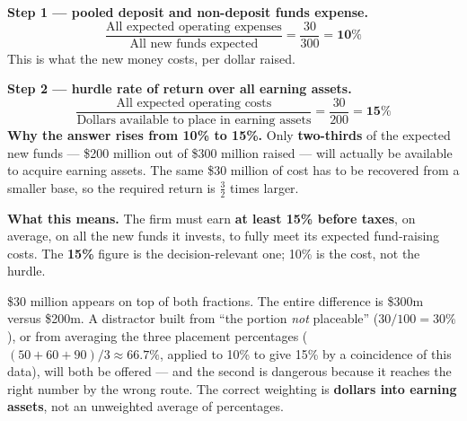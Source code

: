 \begin{lrexbox}
\textbf{Step 1 --- pooled deposit and non-deposit funds expense.}
\[ \frac{\text{All expected operating expenses}}{\text{All new funds expected}} = \frac{30}{300} = \mathbf{10\%} \]
This is what the new money costs, per dollar raised.

\textbf{Step 2 --- hurdle rate of return over all earning assets.}
\[ \frac{\text{All expected operating costs}}{\text{Dollars available to place in earning assets}} = \frac{30}{200} = \mathbf{15\%} \]
\tcblower
\textbf{Why the answer rises from 10\% to 15\%.} Only \textbf{two-thirds} of the expected new funds --- \$200 million out of \$300 million raised --- will actually be available to acquire earning assets. The same \$30 million of cost has to be recovered from a smaller base, so the required return is $\tfrac{3}{2}$ times larger.

\textbf{What this means.} The firm must earn \textbf{at least 15\% before taxes}, on average, on all the new funds it invests, to fully meet its expected fund-raising costs. The \textbf{15\%} figure is the decision-relevant one; 10\% is the cost, not the hurdle.
\end{lrexbox}

\begin{lrtrapbox}
\$30 million appears on top of both fractions. The entire difference is \$300m versus \$200m. A distractor built from ``the portion \emph{not} placeable'' ($30/100 = 30\%$), or from averaging the three placement percentages ($(50+60+90)/3 \approx 66.7\%$, applied to 10\% to give 15\% by a coincidence of this data), will both be offered --- and the second is dangerous because it reaches the right number by the wrong route. The correct weighting is \textbf{dollars into earning assets}, not an unweighted average of percentages.
\end{lrtrapbox}

